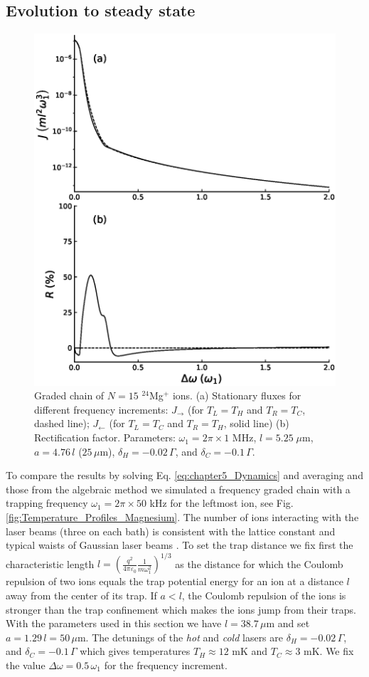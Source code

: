 \subsection{Evolution to steady state \label{Results_A}}

\begin{figure}
  \center
  \includegraphics[width=0.75\linewidth]{Figures/Graded_24Mg_FluxAndRectification_VS_FreqGradient.eps}
  \caption{Graded chain of $N=15$ $^{24}$Mg$^+$ ions. (a) Stationary fluxes for different frequency increments: $J_\rightarrow$   (for $T_L = T_H$ and $T_R = T_C$, dashed line); $J_\leftarrow$ (for $T_L = T_C$ and $T_R = T_H$, solid line) (b) Rectification factor. Parameters: $\omega_1 = 2 \pi \times 1$ MHz, $l = 5.25\;\mu$m, $a = 4.76\, l$ ($25\,\mu$m), $\delta_H = -0.02 \,\Gamma$, and $\delta_C = -0.1 \, \Gamma$.}
  \label{fig:RFG}
\end{figure}

To compare the results by solving Eq. \eqref{eq:chapter5_Dynamics} and averaging and those from the algebraic method we  simulated a frequency graded chain with a trapping frequency $\omega_1 = 2\pi \times 50$ kHz for the leftmost ion, see Fig. \ref{fig:Temperature_Profiles_Magnesium}.  The number of ions interacting with the laser beams (three on each bath) is consistent with the lattice constant and typical waists of Gaussian laser beams \cite{Leupold2015,Lo2015}. To set the trap distance we fix first the characteristic length  $l =  \left(\frac{q^2}{4\pi\varepsilon_0}\frac{1}{m\omega_1^2}\right)^{1/3}$ as the distance for which the Coulomb repulsion of two ions equals the trap  potential energy for an ion at a distance
$l$ away from the center of its trap.
If $a<l$, the Coulomb repulsion of the ions is stronger than the trap confinement which makes the ions jump from their traps. With the parameters used in this section we have $l = 38.7\,\mu$m and set $a = 1.29 \,l=50\,\mu$m. The detunings of the \textit{hot} and \textit{cold} lasers are $\delta_H = -0.02 \, \Gamma$, and $\delta_C = -0.1 \, \Gamma$ which gives temperatures $T_H \approx 12$ mK and $T_C \approx 3$ mK. We fix the value $\Delta\omega = 0.5 \, \omega_1$ for the frequency increment.

